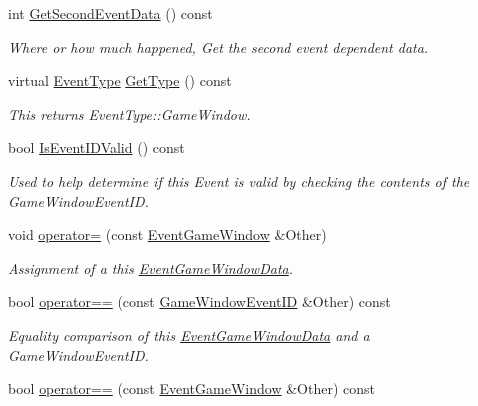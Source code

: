 \begin{DoxyCompactItemize}
int \hyperlink{classMezzanine_1_1EventGameWindow_afeb55f7d4cc99a8c0539fdb02feaea03}{GetSecondEventData} () const 
\begin{DoxyCompactList}\small\item\em Where or how much happened, Get the second event dependent data. \item\end{DoxyCompactList}\item 
virtual \hyperlink{classMezzanine_1_1EventBase_ab85e31e97753b7e7ecb098f82526baef}{EventType} \hyperlink{classMezzanine_1_1EventGameWindow_a6658ffa68d0d39e2718214fb7a7da3d7}{GetType} () const 
\begin{DoxyCompactList}\small\item\em This returns EventType::GameWindow. \item\end{DoxyCompactList}\item 
bool \hyperlink{classMezzanine_1_1EventGameWindow_ab51a632acaf07f9a46817467ca54efca}{IsEventIDValid} () const 
\begin{DoxyCompactList}\small\item\em Used to help determine if this Event is valid by checking the contents of the GameWindowEventID. \item\end{DoxyCompactList}\item 
void \hyperlink{classMezzanine_1_1EventGameWindow_a6935c29b1cf42798871e8a6e6600fa2e}{operator=} (const \hyperlink{classMezzanine_1_1EventGameWindow}{EventGameWindow} \&Other)
\begin{DoxyCompactList}\small\item\em Assignment of a this \hyperlink{classMezzanine_1_1EventGameWindowData}{EventGameWindowData}. \item\end{DoxyCompactList}\item 
bool \hyperlink{classMezzanine_1_1EventGameWindow_aedf12ca51b11e074d8cb8baa801c19fa}{operator==} (const \hyperlink{classMezzanine_1_1EventGameWindow_a0f0ff29853317334f018bcf48d502af2}{GameWindowEventID} \&Other) const 
\begin{DoxyCompactList}\small\item\em Equality comparison of this \hyperlink{classMezzanine_1_1EventGameWindowData}{EventGameWindowData} and a GameWindowEventID. \item\end{DoxyCompactList}\item 
bool \hyperlink{classMezzanine_1_1EventGameWindow_a10469157e4d442072a5751029a347056}{operator==} (const \hyperlink{classMezzanine_1_1EventGameWindow}{EventGameWindow} \&Other) const 

\end{DoxyCompactItemize}
